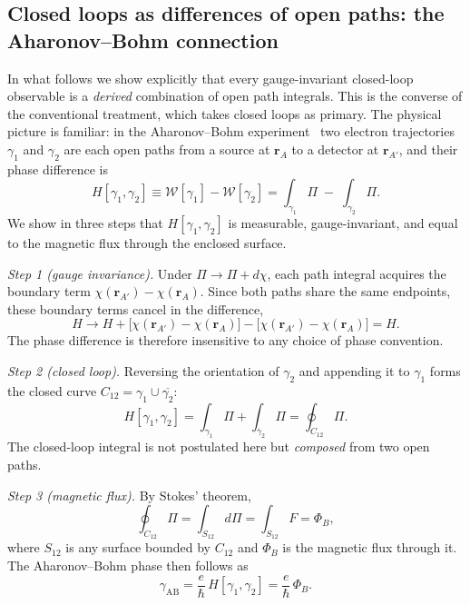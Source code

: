 \documentclass[%
 reprint, amsmath,amssymb, aps, prb, ]{revtex4-2}
\numberwithin{equation}{section}
\newcommand{\WL}{\mathcal{W}}
\begin{document}
\subsection{Closed loops as differences of open paths: the Aharonov--Bohm connection}

In what follows we show explicitly that every gauge-invariant closed-loop observable is a \emph{derived} combination of open path integrals. This is the converse of the conventional treatment, which takes closed loops as primary. The physical picture is familiar: in the Aharonov--Bohm experiment~\cite{Aharonov1959,Tonomura1986} two electron trajectories $\gamma_1$ and $\gamma_2$ are each open paths from a source at $\mathbf{r}_A$ to a detector at $\mathbf{r}_{A'}$, and their phase difference is
\begin{equation}
H[\gamma_1, \gamma_2] \equiv \WL[\gamma_1] - \WL[\gamma_2]
= \int_{\gamma_1}\Pi \;-\; \int_{\gamma_2}\Pi.
\label{eq:H_def}
\end{equation}
We show in three steps that $H[\gamma_1,\gamma_2]$ is measurable, gauge-invariant, and equal to the magnetic flux through the enclosed surface.

\textit{Step 1 (gauge invariance).} Under $\Pi \to \Pi + d\chi$, each path integral acquires the boundary term $\chi(\mathbf{r}_{A'}) - \chi(\mathbf{r}_A)$. Since both paths share the same endpoints, these boundary terms cancel in the difference,
\begin{equation}
H \to H
+ \bigl[\chi(\mathbf{r}_{A'}) - \chi(\mathbf{r}_A)\bigr]
- \bigl[\chi(\mathbf{r}_{A'}) - \chi(\mathbf{r}_A)\bigr]
= H.
\label{eq:H_gauge}
\end{equation}
The phase difference is therefore insensitive to any choice of phase convention.

\textit{Step 2 (closed loop).} Reversing the orientation of $\gamma_2$ and appending it to $\gamma_1$ forms the closed curve $C_{12} = \gamma_1 \cup \overline{\gamma_2}$:
\begin{equation}
H[\gamma_1,\gamma_2]
= \int_{\gamma_1}\Pi + \int_{\overline{\gamma}_2}\Pi
= \oint_{C_{12}}\Pi.
\label{eq:H_loop}
\end{equation}
The closed-loop integral is not postulated here but \emph{composed} from two open paths.

\textit{Step 3 (magnetic flux).} By Stokes' theorem,
\begin{equation}
\oint_{C_{12}}\Pi = \int_{S_{12}}d\Pi = \int_{S_{12}}F = \Phi_B,
\label{eq:H_flux}
\end{equation}
where $S_{12}$ is any surface bounded by $C_{12}$ and $\Phi_B$ is the magnetic flux through it. The Aharonov--Bohm phase then follows as
\begin{equation}
\gamma_{\text{AB}} = \frac{e}{\hbar}\,H[\gamma_1,\gamma_2]
= \frac{e}{\hbar}\,\Phi_B.
\label{eq:AB_phase}
\end{equation}
\end{document}
